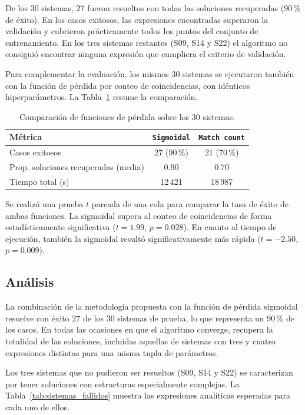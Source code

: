 De los 30 sistemas, 27 fueron resueltos con todas las soluciones recuperadas (90\,\% de éxito). En los casos exitosos, las expresiones encontradas superaron la validación y cubrieron prácticamente todos los puntos del conjunto de entrenamiento. En los tres sistemas restantes (S09, S14 y S22) el algoritmo no consiguió encontrar ninguna expresión que cumpliera el criterio de validación.

\bigskip Para complementar la evaluación, los mismos 30 sistemas se ejecutaron también con la función de pérdida por conteo de coincidencias, con idénticos hiperparámetros. La Tabla~\ref{tab:comparacion_sistemas_loss} resume la comparación.

\begin{table}[H] \centering \caption{Comparación de funciones de pérdida sobre los 30 sistemas.} \label{tab:comparacion_sistemas_loss} \begin{tabular}{lcc} \hline
Métrica & \texttt{Sigmoidal} & \texttt{Match count} \\
\hline
Casos exitosos & 27 (90\,\%) & 21 (70\,\%) \\
Prop. soluciones recuperadas (media) & 0.90 & 0.70 \\
Tiempo total (s) & 12\,421 & 18\,987 \\
\hline \end{tabular} \end{table}

Se realizó una prueba $t$ pareada de una cola para comparar la tasa de éxito de ambas funciones. La sigmoidal supera al conteo de coincidencias de forma estadísticamente significativa ($t = 1.99$, $p = 0.028$). En cuanto al tiempo de ejecución, también la sigmoidal resultó significativamente más rápida ($t = -2.50$, $p = 0.009$).

\subsection{Análisis} \label{sec:analisis_fase2}

La combinación de la metodología propuesta con la función de pérdida sigmoidal resuelve con éxito 27 de los 30 sistemas de prueba, lo que representa un 90\,\% de los casos. En todas las ocasiones en que el algoritmo converge, recupera la totalidad de las soluciones, incluidas aquellas de sistemas con tres y cuatro expresiones distintas para una misma tupla de parámetros.

Los tres sistemas que no pudieron ser resueltos (S09, S14 y S22) se caracterizan por tener soluciones con estructuras especialmente complejas. La Tabla~\ref{tab:sistemas_fallidos} muestra las expresiones analíticas esperadas para cada uno de ellos.

